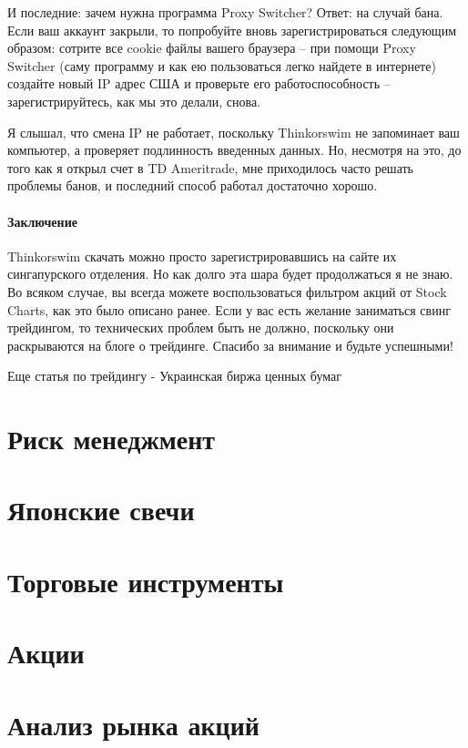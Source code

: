 \documentclass[a5paper]{article}
\begin{document}
И последние: зачем нужна программа Proxy Switcher? Ответ: на случай бана. Если ваш аккаунт закрыли, то попробуйте вновь зарегистрироваться следующим образом: сотрите все cookie файлы вашего браузера – при помощи Proxy Switcher (саму программу и как ею пользоваться легко найдете в интернете) создайте новый IP адрес США и проверьте его работоспособность – зарегистрируйтесь, как мы это делали, снова.

Я слышал, что смена IP не работает, поскольку Thinkorswim не
запоминает ваш компьютер, а проверяет подлинность введенных
данных. Но, несмотря на это, до того как я открыл счет в TD
Ameritrade, мне приходилось часто решать проблемы банов, и последний
способ работал достаточно хорошо.

\paragraph{Заключение}

Thinkorswim скачать можно просто зарегистрировавшись на сайте их сингапурского отделения. Но как долго эта шара будет продолжаться я не знаю. Во всяком случае, вы всегда можете воспользоваться фильтром акций от Stock Charts, как это было описано ранее. Если у вас есть желание заниматься свинг трейдингом, то технических проблем быть не должно, поскольку они раскрываются на блоге о трейдинге. Спасибо за внимание и будьте успешными!


Еще статья по трейдингу - Украинская биржа ценных бумаг


\section{Риск менеджмент}

\section{Японские свечи}

\section{Торговые инструменты}

\section{Акции}

\section{Анализ рынка акций}
\end{document}
